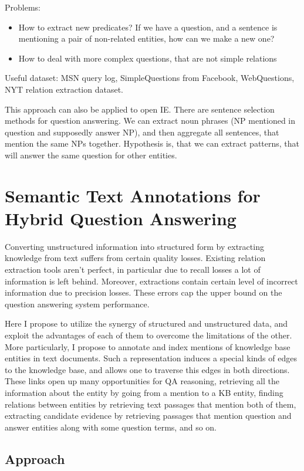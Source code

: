 Problems:
\begin{itemize}
\item How to extract new predicates? If we have a question, and a sentence is mentioning a pair of non-related entities, how can we make a new one?
\item How to deal with more complex questions, that are not simple relations
\end{itemize}

Useful dataset: MSN query log, SimpleQuestions from Facebook, WebQuestions, NYT relation extraction dataset.

This approach can also be applied to open IE.
There are sentence selection methods for question answering.
We can extract noun phrases (NP mentioned in question and supposedly answer NP), and then aggregate all sentences, that mention the same NPs together.
Hypothesis is, that we can extract patterns, that will answer the same question for other entities.

\section{Semantic Text Annotations for Hybrid Question Answering}
\label{sec:text+kb}

Converting unstructured information into structured form by extracting knowledge from text suffers from certain quality losses.
Existing relation extraction tools aren't perfect, in particular due to recall losses a lot of information is left behind.
Moreover, extractions contain certain level of incorrect information due to precision losses.
These errors cap the upper bound on the question answering system performance.

Here I propose to utilize the synergy of structured and unstructured data, and exploit the advantages of each of them to overcome the limitations of the other.
More particularly, I propose to annotate and index mentions of knowledge base entities in text documents.
Such a representation induces a special kinds of edges to the knowledge base, and allows one to traverse this edges in both directions.
These links open up many opportunities for QA reasoning, \eg retrieving all the information about the entity by going from a mention to a KB entity, finding relations between entities by retrieving text passages that mention both of them, extracting candidate evidence by retrieving passages that mention question and answer entities along with some question terms, and so on.

\subsection{Approach}
\label{subsec:text+kb_approach}

